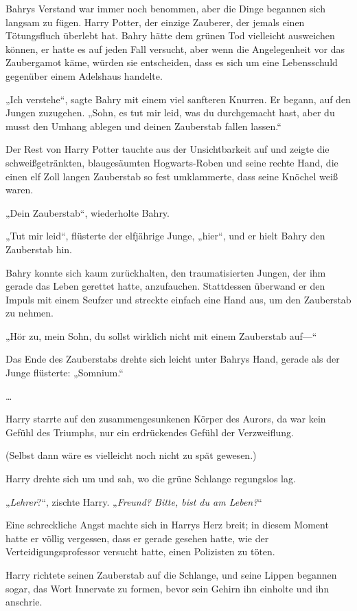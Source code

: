 {Bahrys Verstand war immer noch benommen, aber die Dinge begannen sich langsam zu fügen. Harry Potter, der einzige Zauberer, der jemals einen Tötungsfluch überlebt hat. Bahry hätte dem grünen Tod vielleicht ausweichen können, er hatte es auf jeden Fall versucht, aber wenn die Angelegenheit vor das Zaubergamot käme, würden sie entscheiden, dass es sich um eine Lebensschuld gegenüber einem Adelshaus handelte.

„Ich verstehe“, sagte Bahry mit einem viel sanfteren Knurren. Er begann, auf den Jungen zuzugehen. „Sohn, es tut mir leid, was du durchgemacht hast, aber du musst den Umhang ablegen und deinen Zauberstab fallen lassen.“

Der Rest von Harry Potter tauchte aus der Unsichtbarkeit auf und zeigte die schweißgetränkten, blaugesäumten Hogwarts-Roben und seine rechte Hand, die einen elf Zoll langen Zauberstab so fest umklammerte, dass seine Knöchel weiß waren.

„Dein Zauberstab“, wiederholte Bahry.

„Tut mir leid“, flüsterte der elfjährige Junge, „hier“, und er hielt Bahry den Zauberstab hin.

Bahry konnte sich kaum zurückhalten, den traumatisierten Jungen, der ihm gerade das Leben gerettet hatte, anzufauchen. Stattdessen überwand er den Impuls mit einem Seufzer und streckte einfach eine Hand aus, um den Zauberstab zu nehmen.

„Hör zu, mein Sohn, du sollst wirklich nicht mit einem Zauberstab auf—“

Das Ende des Zauberstabs drehte sich leicht unter Bahrys Hand, gerade als der Junge flüsterte: „Somnium.“

…

Harry starrte auf den zusammengesunkenen Körper des Aurors, da war kein Gefühl des Triumphs, nur ein erdrückendes Gefühl der Verzweiflung.

(Selbst dann wäre es vielleicht noch nicht zu spät gewesen.)

Harry drehte sich um und sah, wo die grüne Schlange regungslos lag.

„\emph{Lehrer}?“, zischte Harry. „\emph{Freund? Bitte, bist du am Leben?}“

Eine schreckliche Angst machte sich in Harrys Herz breit; in diesem Moment hatte er völlig vergessen, dass er gerade gesehen hatte, wie der Verteidigungsprofessor versucht hatte, einen Polizisten zu töten.

Harry richtete seinen Zauberstab auf die Schlange, und seine Lippen begannen sogar, das Wort Innervate zu formen, bevor sein Gehirn ihn einholte und ihn anschrie.

}
